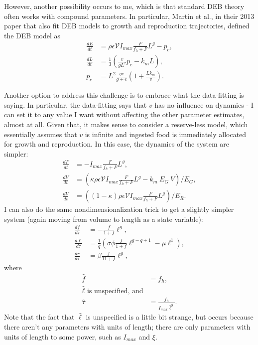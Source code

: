 \documentclass[12pt,reqno,final,pdftex]{amsart}\usepackage[]{graphicx}\usepackage[]{color}
\theoremstyle{plain}
\numberwithin{equation}{part}
\begin{document}
However, another possibility occurs to me, which is that standard DEB theory often works with compound parameters.
In particular, Martin et al., in their 2013 paper that also fit DEB models to growth and reproduction trajectories, defined the DEB model as
\begin{align}
  \frac{dE}{dt} &= \rho \epsilon \mathcal{V} I_{max} \frac{F}{f_h+F} L^g - p_c, \\
  \frac{dL}{dt} &= \frac{1}{3}\left(\frac{v}{gL^2} p_c - k_m L\right), \\
p_c &= L^2 \frac{g e}{g + e}\left(1 + \frac{L k_m}{v}\right).
\end{align}





Another option to address this challenge is to embrace what the data-fitting is saying.
In particular, the data-fitting says that $v$ has no influence on dynamics - I can set it to any value I want without affecting the other parameter estimates, almost at all.
Given that, it makes sense to consider a reserve-less model, which essentially assumes that $v$ is infinite and ingested food is immediately allocated for growth and reproduction.
In this case, the dynamics of the system are simpler:
\begin{align}
\frac{dF}{dt} &= -I_{max} \frac{F}{f_h+F} L^g, \\
\frac{dV}{dt} &= \left(\kappa \rho \epsilon \mathcal{V} I_{max} \frac{F}{f_h+F} L^g - k_m~E_G~V\right)/E_G, \\
\frac{dV}{dt} &= \left((1-\kappa) \rho \epsilon \mathcal{V} I_{max} \frac{F}{f_h+F} L^g\right)/E_R.
\end{align}
I can also do the same nondimensionalization trick to get a slightly simpler system (again moving from volume to length as a state variable):
\begin{align}
\frac{df}{d\tau}&=-\frac{f}{1+f} \ell^g, \\
\frac{d\ell}{d\tau}&=\frac{1}{q}\left(\sigma \phi \frac{f}{1+f}\ell^{g-q+1}-\mu \ell^1\right), \\
\frac{dr}{d\tau}&=\beta\frac{f}{11+f}\ell^g,
\end{align}
where
\begin{align}
\hat{f} &= f_h, \\
\hat{\ell} \text{ is unspecified, and} \\
\hat{\tau} &= \frac{f_h}{I_{max}\hat{\ell}^g}.
\end{align}
Note that the fact that $\hat{\ell}$ is unspecified is a little bit strange, but occurs because there aren't any parameters with units of length; there are only parameters with units of length to some power, such as $I_{max}$ and $\xi$.
\end{document}
